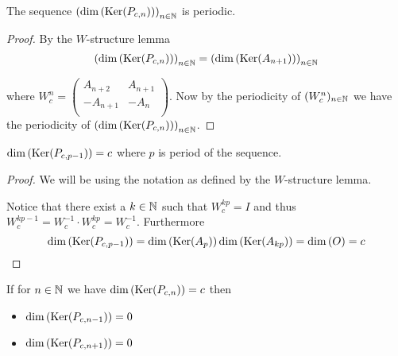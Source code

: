 \begin{proposition}
  The sequence $\left(\dim\left(\operatorname{Ker}(P_{c,n})\right)\right)_{n\in\mathbb{N}}$
  is periodic.
\end{proposition}

\begin{proof}
  By the $W$-structure lemma
  \[
  \left(\dim\left(\operatorname{Ker}(P_{c,n})\right)\right)_{n\in\mathbb{N}} 
  = 
  \left(\dim\left(\operatorname{Ker}(A_{n+1})\right)\right)_{n\in\mathbb{N}}
  \]

  where $W_{c}^{n}=\left(\begin{smallmatrix} A_{n+2} & A_{n+1}  \\ -A_{n+1} & -A_{n} \\\end{smallmatrix}\right)$.
  Now  by the periodicity of $(W_{c}^{n})_{n\in\mathbb{N}}$ we have the
  periodicity of
  $\left(\dim\left(\operatorname{Ker}(P_{c,n})\right)\right)_{n\in\mathbb{N}}$.
\end{proof}

\begin{lemma}
  $\dim\left(\operatorname{Ker}(P_{c,p-1})\right) = c$ where $p$ is period of the sequence. 
\end{lemma}

\begin{proof}
  We will be using the notation as defined by the $W$-structure lemma.

  Notice that there exist a $k\in\mathbb{N}$ such that $W_{c}^{kp} = I$ and
  thus $W_{c}^{kp-1} = W_{c}^{-1} \cdot W_{c}^{kp} = W_{c}^{-1}$. 
  Furthermore
  \[
  \dim\left(\operatorname{Ker}(P_{c,p-1})\right)
  =
  \dim\left(\operatorname{Ker}(A_{p})\right)
  \dim\left(\operatorname{Ker}(A_{kp})\right) = \dim\left(O\right)
  = c
  \]
\end{proof}

\begin{lemma}
  If for $n\in\mathbb{N}$ we have $\dim\left(\operatorname{Ker}(P_{c,n})\right) = c$ then
  \begin{itemize}
    \item $\dim\left(\operatorname{Ker}(P_{c,n-1})\right) = 0$
    \item $\dim\left(\operatorname{Ker}(P_{c,n+1})\right) = 0$
  \end{itemize}
\end{lemma}


